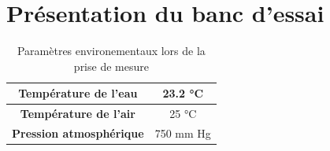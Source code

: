 \section{Présentation du banc d'essai}

\begin{table}[H]
\centering
\caption{Paramètres environementaux lors de la prise de mesure}
    \label{tab:enviro}
    \begin{tabular}{|c|c|}
        \hline
	\textbf{Température de l'eau} & 23.2 °C \\
        \hline
	\textbf{Température de l'air} & 25 °C \\
        \hline
	\textbf{Pression atmosphérique} & 750 mm Hg \\
        \hline
    \end{tabular}
\end{table}	

